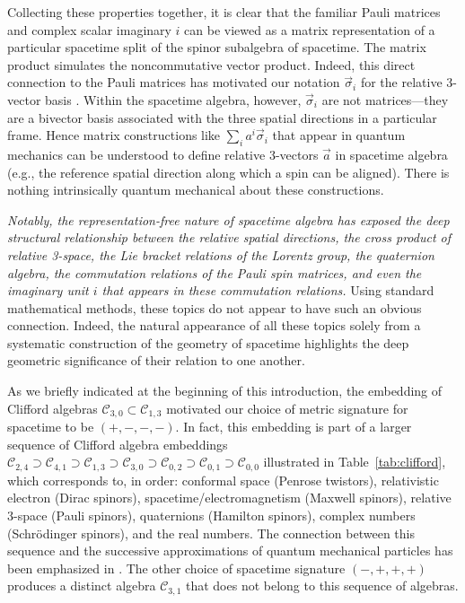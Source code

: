 \documentclass[1p,sort&compress]{elsarticle}
\numberwithin{equation}{section}
\newcommand{\rv}[1]{\vec{#1}}
\begin{document}
Collecting these properties together, it is clear that the familiar Pauli matrices and complex scalar imaginary $i$ can be viewed as a matrix representation of a particular spacetime split of the spinor subalgebra of spacetime.  The matrix product simulates the noncommutative vector product.  Indeed, this direct connection to the Pauli matrices has motivated our notation $\rv{\sigma}_i$ for the relative 3-vector basis \cite{Hestenes2005}.  Within the spacetime algebra, however, $\rv{\sigma}_i$ are not matrices---they are a bivector basis associated with the three spatial directions in a particular frame.  Hence matrix constructions like $\sum_i a^i \rv{\sigma}_i$ that appear in quantum mechanics can be understood to define relative 3-vectors $\rv{a}$ in spacetime algebra (e.g., the reference spatial direction along which a spin can be aligned).  There is nothing intrinsically quantum mechanical about these constructions.  

\emph{Notably, the representation-free nature of spacetime algebra has exposed the deep structural relationship between the relative spatial directions, the cross product of relative 3-space, the Lie bracket relations of the Lorentz group, the quaternion algebra, the commutation relations of the Pauli spin matrices, and even the imaginary unit $i$ that appears in these commutation relations.}  Using standard mathematical methods, these topics do not appear to have such an obvious connection.  Indeed, the natural appearance of all these topics solely from a systematic construction of the geometry of spacetime highlights the deep geometric significance of their relation to one another.

As we briefly indicated at the beginning of this introduction, the embedding of Clifford algebras $\mathcal{C}_{3,0} \subset \mathcal{C}_{1,3}$ motivated our choice of metric signature for spacetime to be $(+,-,-,-)$.  In fact, this embedding is part of a larger sequence of Clifford algebra embeddings $\mathcal{C}_{2,4}\supset\mathcal{C}_{4,1}\supset\mathcal{C}_{1,3}\supset\mathcal{C}_{3,0}\supset\mathcal{C}_{0,2}\supset\mathcal{C}_{0,1}\supset\mathcal{C}_{0,0}$ illustrated in Table~\ref{tab:clifford}, which corresponds to, in order: conformal space (Penrose twistors), relativistic electron (Dirac spinors), spacetime/electromagnetism (Maxwell spinors), relative 3-space (Pauli spinors), quaternions (Hamilton spinors), complex numbers (Schr\"odinger spinors), and the real numbers.  The connection between this sequence and the successive approximations of quantum mechanical particles has been emphasized in \cite{Hiley2012,Hiley2001,Hiley2010a,Hiley2010b}.  The other choice of spacetime signature $(-,+,+,+)$ produces a distinct algebra $\mathcal{C}_{3,1}$ that does not belong to this sequence of algebras.
\end{document}
